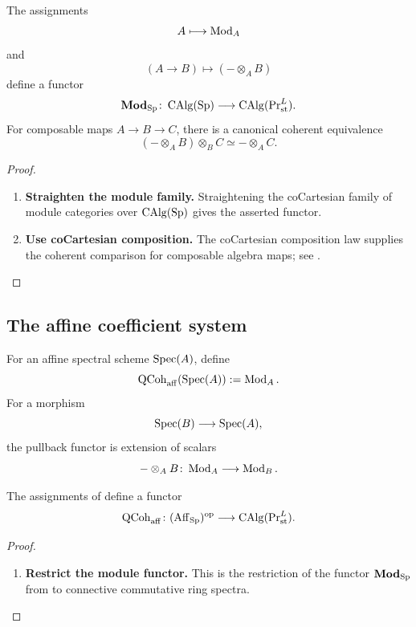 \begin{proposition}
\label{prop:spectral-module-functoriality}
The assignments
\[
    A
    \longmapsto
    \operatorname{Mod}_A
\]
and
\[
    (A\to B)
    \longmapsto
    (-\otimes_A B)
\]
define a functor
\[
    \mathbf{Mod}_{\operatorname{Sp}}
    \colon
    \operatorname{CAlg}(\operatorname{Sp})
    \longrightarrow
    \operatorname{CAlg}(\operatorname{Pr}^L_{\mathrm{st}}).
\]
For composable maps $A\to B\to C$, there is a canonical coherent
equivalence
\[
    (-\otimes_A B)\otimes_B C
    \simeq
    -\otimes_A C.
\]
\end{proposition}

\begin{proof}
\leavevmode
\begin{enumerate}[label=\textup{(\arabic*)}]
    \item \textbf{Straighten the module family.}
    Straightening the coCartesian family of module categories over
    $\operatorname{CAlg}(\operatorname{Sp})$ gives the asserted functor.

    \item \textbf{Use coCartesian composition.}
    The coCartesian composition law
    supplies the coherent comparison for composable algebra maps; see
    \cite{LurieHigherAlgebra}.
\end{enumerate}
\end{proof}

\subsection{The affine coefficient system}

\begin{definition}
\label{def:affine-spectral-qcoh}
For an affine spectral scheme $\operatorname{Spec}(A)$, define
\[
    \operatorname{QCoh}_{\mathrm{aff}}(\operatorname{Spec}(A))
    :=
    \operatorname{Mod}_A.
\]
For a morphism
\[
    \operatorname{Spec}(B)
    \longrightarrow
    \operatorname{Spec}(A),
\]
the pullback functor is extension of scalars
\[
    -\otimes_A B
    \colon
    \operatorname{Mod}_A
    \longrightarrow
    \operatorname{Mod}_B.
\]
\end{definition}

\begin{proposition}
\label{prop:affine-qcoh-coefficient-system}
The assignments of  define a functor
\[
    \operatorname{QCoh}_{\mathrm{aff}}
    \colon
    (\operatorname{Aff}_{\operatorname{Sp}})^{\mathrm{op}}
    \longrightarrow
    \operatorname{CAlg}(\operatorname{Pr}^L_{\mathrm{st}}).
\]
\end{proposition}

\begin{proof}
\leavevmode
\begin{enumerate}[label=\textup{(\arabic*)}]
    \item \textbf{Restrict the module functor.}
    This is the restriction of the functor
    $\mathbf{Mod}_{\operatorname{Sp}}$ from
     to connective commutative ring
    spectra.
\end{enumerate}
\end{proof}


